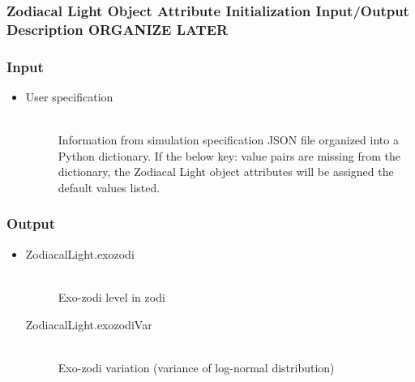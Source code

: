 \documentclass[cleanfoot]{asme2ej}
\begin{document}
\subsubsection{Zodiacal Light Object Attribute Initialization Input/Output Description ORGANIZE LATER}
\subsubsection*{Input}
\begin{itemize}
    \item
    \begin{description}
        \item[User specification] \hfill \\
        Information from simulation specification JSON file organized into a Python dictionary. If the below key: value pairs are missing from the dictionary, the Zodiacal Light object attributes will be assigned the default values listed.
    \end{description}
\end{itemize}

\subsubsection*{Output}
\begin{itemize}
    \item 
    \begin{description}
        \item[ZodiacalLight.exozodi] \hfill \\
        Exo-zodi level in zodi
        \item[ZodiacalLight.exozodiVar] \hfill \\
        Exo-zodi variation (variance of log-normal distribution)
    \end{description}
\end{itemize}

\end{document}
